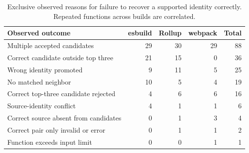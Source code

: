 \begin{table}[t]
\caption{Exclusive observed reasons for failure to recover a supported identity correctly. Repeated functions across builds are correlated.}
\label{tab:v8-barriers}
\centering
\small
\begin{tabular}{lrrrr}
\toprule
Observed outcome & esbuild & Rollup & webpack & Total\\
\midrule
Multiple accepted candidates & 29 & 30 & 29 & 88\\
Correct candidate outside top three & 21 & 15 & 0 & 36\\
Wrong identity promoted & 9 & 11 & 5 & 25\\
No matched neighbor & 10 & 5 & 4 & 19\\
Correct top-three candidate rejected & 4 & 6 & 6 & 16\\
Source-identity conflict & 4 & 1 & 1 & 6\\
Correct source absent from candidates & 0 & 1 & 3 & 4\\
Correct pair only invalid or error & 0 & 1 & 1 & 2\\
Function exceeds input limit & 0 & 0 & 1 & 1\\
\bottomrule
\end{tabular}
\end{table}

